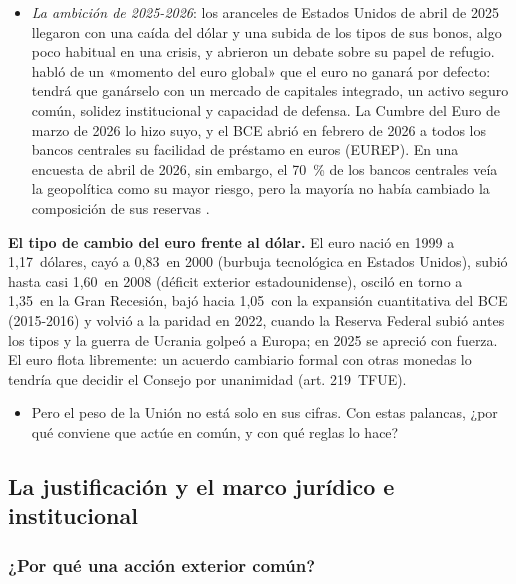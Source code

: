 \documentclass[11pt]{article}
\begin{document}
\begin{itemize}
\item \emph{La ambición de 2025-2026}: los aranceles de Estados Unidos de abril de 2025 llegaron con una caída del dólar y una subida de los tipos de sus bonos, algo poco habitual en una crisis, y abrieron un debate sobre su papel de refugio. \textcite{Lagarde2025Influencia} habló de un «momento del euro global» que el euro no ganará por defecto: tendrá que ganárselo con un mercado de capitales integrado, un activo seguro común, solidez institucional y capacidad de defensa. La Cumbre del Euro de marzo de 2026 lo hizo suyo, y el BCE abrió en febrero de 2026 a todos los bancos centrales su facilidad de préstamo en euros (EUREP)\nocite{BCE2026EUREP}. En una encuesta de abril de 2026, sin embargo, el 70~\% de los bancos centrales veía la geopolítica como su mayor riesgo, pero la mayoría no había cambiado la composición de sus reservas\nocite{BCE2026PapelEuro} .
\end{itemize}

\begin{anotaciones}
\textbf{El tipo de cambio del euro frente al dólar.} El euro nació en 1999 a 1,17~dólares, cayó a 0,83~en 2000 (burbuja tecnológica en Estados Unidos), subió hasta casi 1,60~en 2008 (déficit exterior estadounidense), osciló en torno a 1,35~en la Gran Recesión, bajó hacia 1,05~con la expansión cuantitativa del BCE (2015-2016) y volvió a la paridad en 2022, cuando la Reserva Federal subió antes los tipos y la guerra de Ucrania golpeó a Europa; en 2025 se apreció con fuerza. El euro flota libremente: un acuerdo cambiario formal con otras monedas lo tendría que decidir el Consejo por unanimidad (art. 219~TFUE)\nocite{BCE2026PapelEuro,UE2016TFUE}.
\end{anotaciones}

\begin{itemize}
\item Pero el peso de la Unión no está solo en sus cifras. Con estas palancas, ¿por qué conviene que actúe en común, y con qué reglas lo hace?
\end{itemize}

\subsection{La justificación y el marco jurídico e institucional}\label{sec:marco}

\subsubsection{¿Por qué una acción exterior común?}\label{sec:teoria}
\end{document}
